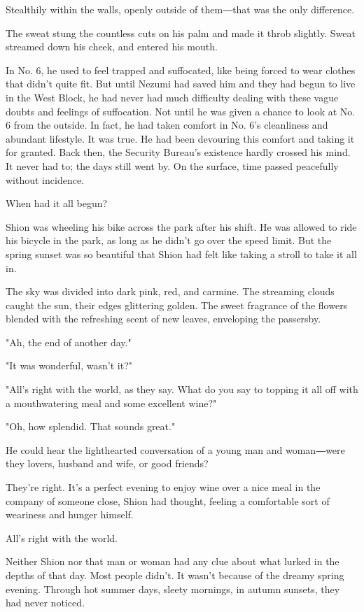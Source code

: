 Stealthily within the walls, openly outside of them―that was the only
difference.

The sweat stung the countless cuts on his palm and made it throb
slightly. Sweat streamed down his cheek, and entered his mouth.

In No. 6, he used to feel trapped and suffocated, like being forced to
wear clothes that didn't quite fit. But until Nezumi had saved him and
they had begun to live in the West Block, he had never had much
difficulty dealing with these vague doubts and feelings of suffocation.
Not until he was given a chance to look at No. 6 from the outside. In
fact, he had taken comfort in No. 6's cleanliness and abundant
lifestyle. It was true. He had been devouring this comfort and taking it
for granted. Back then, the Security Bureau's existence hardly crossed
his mind. It never had to; the days still went by. On the surface, time
passed peacefully without incidence.

When had it all begun?

Shion was wheeling his bike across the park after his shift. He was
allowed to ride his bicycle in the park, as long as he didn't go over
the speed limit. But the spring sunset was so beautiful that Shion had
felt like taking a stroll to take it all in.

The sky was divided into dark pink, red, and carmine. The streaming
clouds caught the sun, their edges glittering golden. The sweet
fragrance of the flowers blended with the refreshing scent of new
leaves, enveloping the passersby.

"Ah, the end of another day."

"It was wonderful, wasn't it?"

"All's right with the world, as they say. What do you say to topping it
all off with a mouthwatering meal and some excellent wine?"

"Oh, how splendid. That sounds great."

He could hear the lighthearted conversation of a young man and
woman―were they lovers, husband and wife, or good friends?

They're right. It's a perfect evening to enjoy wine over a nice meal in
the company of someone close, Shion had thought, feeling a comfortable
sort of weariness and hunger himself.

All's right with the world.

Neither Shion nor that man or woman had any clue about what lurked in
the depths of that day. Most people didn't. It wasn't because of the
dreamy spring evening. Through hot summer days, sleety mornings, in
autumn sunsets, they had never noticed.

